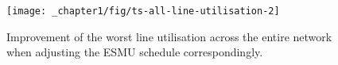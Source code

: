 \begin{figure}\centering
	\texttt{[image: \_chapter1/fig/ts-all-line-utilisation-2]}
\caption{Improvement of the worst line utilisation across the entire network when adjusting the ESMU schedule correspondingly.}
\label{ch1:fig:ts-all-line-utilisation}
\end{figure}